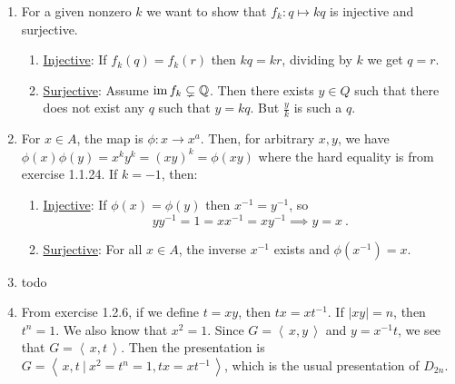\documentclass[]{article}
\newcommand{\abs}[1]{\left\vert #1 \right\vert}
\newcommand{\bbq}{\mathbb{Q}}
\newcommand{\im}{\text{im\,}}
\begin{document}
\begin{enumerate}
\item For a given nonzero $k$ we want to show that $f_k: q \mapsto kq$ is injective and surjective.
\begin{enumerate}
\item \underline{Injective}: If $f_k(q) = f_k(r)$ then $kq = kr$, dividing by $k$ we get $q=r$.
\item \underline{Surjective}: Assume $\im f_k \subsetneq \bbq$. Then there exists $y \in Q$ such that there does not exist any $q$ such that $y = kq$. But $\frac{y}{k}$ is such a $q$.
\end{enumerate}


\item For $x \in A$, the map is $\phi: x \to x^a$. Then, for arbitrary $x,y$, we have $\phi(x)\phi(y) = x^ky^k = (xy)^k = \phi(xy)$ where the hard equality is from exercise 1.1.24. If $k=-1$, then:
\begin{enumerate}
\item \underline{Injective}: If $\phi(x) = \phi(y)$ then $x^{-1} = y^{-1}$, so
\begin{equation}
yy^{-1} = 1 = xx^{-1} = xy^{-1} \implies y = x\ .
\end{equation}
\item \underline{Surjective}: For all $x \in A$, the inverse $x^{-1}$ exists and $\phi(x^{-1}) = x$.
\end{enumerate}


\item {\color{red} todo}


\item From exercise 1.2.6, if we define $t = xy$, then $tx = xt^{-1}$. If $\abs{xy} = n$, then $t^n = 1$. We also know that $x^2 = 1$. Since $G = \left\langle\, x,y\, \right\rangle$ and $y = x^{-1}t$, we see that $G = \left\langle\,  x,t\,  \right\rangle$. Then the presentation is $G = \left\langle\,  x,t\ \vert\ x^2=t^n=1, tx=xt^{-1}\, \right\rangle$, which is the usual presentation of $D_{2n}$.



\end{enumerate}
\end{document}
